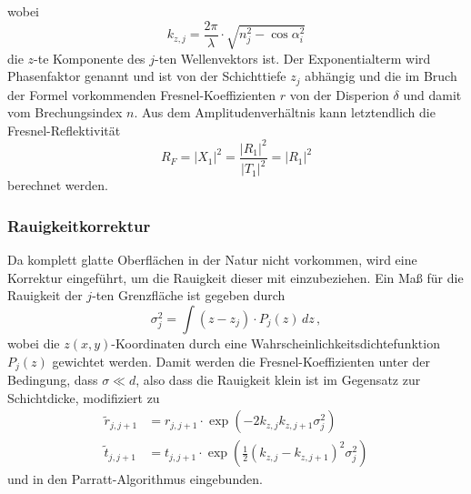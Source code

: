             wobei
            \begin{equation}
                k_{z,j}=\frac{2\pi}{\lambda}\cdot\sqrt{n_j^2-\cos\alpha_i^2}
                \label{eqn:k_z}
            \end{equation}
            die $z$-te Komponente des $j$-ten Wellenvektors ist.
            Der Exponentialterm wird Phasenfaktor genannt und ist von der Schichttiefe $z_j$ abhängig und
            die im Bruch der Formel vorkommenden Fresnel-Koeffizienten $r$ von der Disperion $\delta$ und damit vom Brechungsindex $n$.
            Aus dem Amplitudenverhältnis kann letztendlich die Fresnel-Reflektivität
            \begin{equation}
                R_F=\vert X_1\vert^2=\frac{\vert R_1\vert^2}{\vert T_1\vert^2}=\vert R_1\vert^2
                \label{eqn:R_F_parratt}
            \end{equation}
            berechnet werden.
        \subsubsection{Rauigkeitkorrektur}
            Da komplett glatte Oberflächen in der Natur nicht vorkommen, wird eine Korrektur eingeführt, um die Rauigkeit dieser mit einzubeziehen.
            Ein Maß für die Rauigkeit der $j$-ten Grenzfläche ist gegeben durch
            \begin{equation}
                \sigma_j^2=\int \left(z-z_j\right)\cdot P_j(z) \,dz \, ,
            \end{equation}
            wobei die $z(x,y)$-Koordinaten durch eine Wahrscheinlichkeitsdichtefunktion $P_j(z)$ gewichtet werden.
            Damit werden die Fresnel-Koeffizienten unter der Bedingung, dass $\sigma\ll d$,
            also dass die Rauigkeit klein ist im Gegensatz zur Schichtdicke, modifiziert zu
            \begin{align}
                \tilde{r}_{j,j+1}&=r_{j,j+1}\cdot\exp\left(-2k_{z,j}k_{z,j+1}\sigma_j^2\right) \\
                \tilde{t}_{j,j+1}&=t_{j,j+1}\cdot\exp\left(\frac{1}{2}\left(k_{z,j}-k_{z,j+1}\right)^2\sigma_j^2\right)
                \label{eqn:r_rau}
            \end{align}
            und in den Parratt-Algorithmus eingebunden.